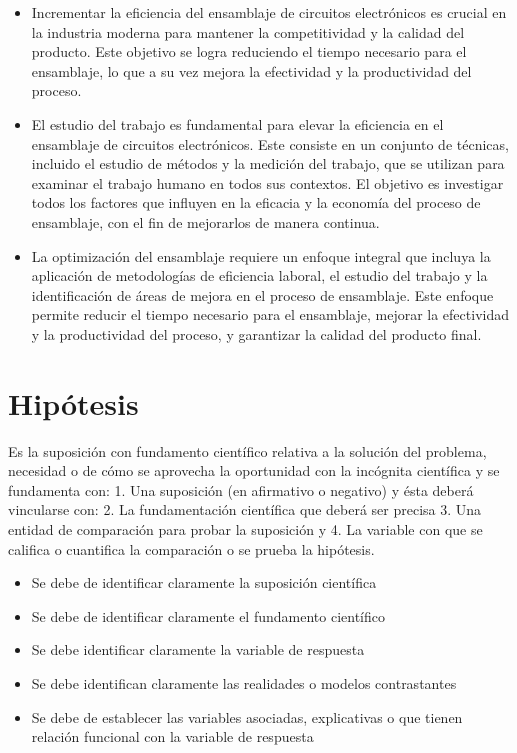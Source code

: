     
    \begin{itemize}
        \item Incrementar la eficiencia del ensamblaje de circuitos electrónicos es crucial en la industria moderna para mantener la competitividad y la calidad del producto. Este objetivo se logra reduciendo el tiempo necesario para el ensamblaje, lo que a su vez mejora la efectividad y la productividad del proceso.
        \item El estudio del trabajo es fundamental para elevar la eficiencia en el ensamblaje de circuitos electrónicos. Este consiste en un conjunto de técnicas, incluido el estudio de métodos y la medición del trabajo, que se utilizan para examinar el trabajo humano en todos sus contextos. El objetivo es investigar todos los factores que influyen en la eficacia y la economía del proceso de ensamblaje, con el fin de mejorarlos de manera continua.\cite{estudio_del_trabajo}
        \item  La optimización del ensamblaje requiere un enfoque integral que incluya la aplicación de metodologías de eficiencia laboral, el estudio del trabajo y la identificación de áreas de mejora en el proceso de ensamblaje. Este enfoque permite reducir el tiempo necesario para el ensamblaje, mejorar la efectividad y la productividad del proceso, y garantizar la calidad del producto final.
        \cite{freivalds2014ingenieria}
    \end{itemize}
    \section{Hipótesis}
    
    Es la suposición con fundamento científico relativa a la solución del problema, necesidad o de cómo se aprovecha la oportunidad con la incógnita científica y se fundamenta con: 1. Una suposición (en afirmativo o negativo) y ésta deberá vincularse con:
    2. La fundamentación científica que deberá ser precisa 3. Una entidad de comparación para probar la suposición y
    4. La variable con que se califica o cuantifica la comparación o se prueba la hipótesis.
    
    \begin{itemize}
        \item Se debe de identificar claramente la suposición científica
        \item Se debe de identificar claramente el fundamento científico
        \item Se debe identificar claramente la variable de respuesta
        \item Se debe identifican claramente las realidades o modelos contrastantes
        \item Se debe de establecer las variables asociadas, explicativas o que tienen relación funcional con la variable de respuesta
    \end{itemize}
